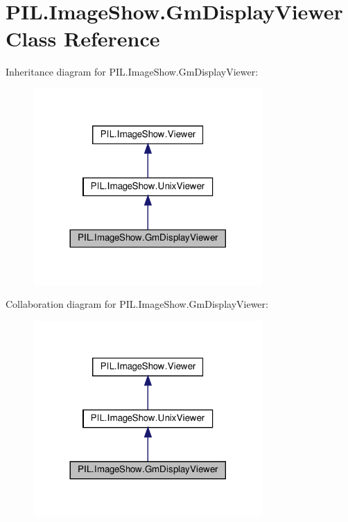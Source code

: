 \hypertarget{classPIL_1_1ImageShow_1_1GmDisplayViewer}{}\section{P\+I\+L.\+Image\+Show.\+Gm\+Display\+Viewer Class Reference}
\label{classPIL_1_1ImageShow_1_1GmDisplayViewer}


Inheritance diagram for P\+I\+L.\+Image\+Show.\+Gm\+Display\+Viewer\+:
\nopagebreak
\begin{figure}[H]
\begin{center}
\leavevmode
\includegraphics[width=248pt]{classPIL_1_1ImageShow_1_1GmDisplayViewer__inherit__graph}
\end{center}
\end{figure}


Collaboration diagram for P\+I\+L.\+Image\+Show.\+Gm\+Display\+Viewer\+:
\nopagebreak
\begin{figure}[H]
\begin{center}
\leavevmode
\includegraphics[width=248pt]{classPIL_1_1ImageShow_1_1GmDisplayViewer__coll__graph}
\end{center}
\end{figure}
